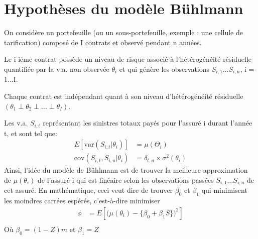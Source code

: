 \section{Hypothèses du modèle Bühlmann}
\label{sec:hypo:buhl}
On considère un portefeuille (ou un sous-portefeuille, exemple : une cellule de tarification) composé de I contrats et observé pendant n années.

Le i-iéme contrat possède un niveau de risque associé à l'hétérogénéité résiduelle quantifiée par la v.a. non observée $\theta_i$ et qui génère les observations $S_{i,1}...S_{i,n} $, i = 1...I.

Chaque contrat est indépendant quant à son niveau d'hétérogénéité résiduelle $(\theta_1 \perp \theta_2 \perp...\perp\theta_I)$.

Les v.a. $S_{i,t}$ représentant les sinistres totaux payés pour l'assuré i durant l'année t, et sont tel que:
\begin{align*}
E[\text{var}(S_{i,t}|\theta_i)] &= \mu(\Theta_i) \\
\text{cov}(S_{i,t}, S_{i,u}|\theta_i) &= \delta_{t,u} \times \sigma^2(\theta_i)
\end{align*}
Ainsi, l'idée du modèle de Bühlmann est de trouver la meilleure approximation de $\mu(\theta_i)$ de l'assuré i qui est linéaire selon les observations passées $S_{i,1}...S_{i,n} $ de cet assuré.
En mathématique, ceci veut dire de trouver $\beta_0$ et $\beta_1$ qui minimisent les moindres carrées espérés, c'est-à-dire minimiser
\begin{align*}
\phi &= E[\big( \mu(\theta_i) - \lbrace\beta_0 + \beta_1 \overline{S}\rbrace \big)^2] \\
\end{align*}
Où $\beta_0 = (1 - Z)m$ et $\beta_1 =Z$
\\

